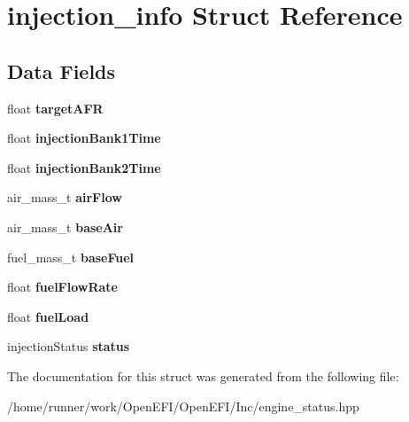\hypertarget{structinjection__info}{}\section{injection\+\_\+info Struct Reference}
\label{structinjection__info}
\subsection*{Data Fields}
\begin{DoxyCompactItemize}
\item 
\mbox{\label{structinjection__info_ae0092c39808dc3142c3d3d9ff9a287a1}} 
float {\bfseries target\+A\+FR}
\item 
\mbox{\label{structinjection__info_aa680a09463b9ce4a25fab9b55d8faf37}} 
float {\bfseries injection\+Bank1\+Time}
\item 
\mbox{\label{structinjection__info_ad1c2f5e303fa43a98c50a3b119919734}} 
float {\bfseries injection\+Bank2\+Time}
\item 
\mbox{\label{structinjection__info_aaabc3c6fa43d19796479d4b903c5fe0a}} 
air\+\_\+mass\+\_\+t {\bfseries air\+Flow}
\item 
\mbox{\label{structinjection__info_a87091e6f6a933f9f7f453be078176e71}} 
air\+\_\+mass\+\_\+t {\bfseries base\+Air}
\item 
\mbox{\label{structinjection__info_a0a944518225f2a4ec22f0a08cbaf7dff}} 
fuel\+\_\+mass\+\_\+t {\bfseries base\+Fuel}
\item 
\mbox{\label{structinjection__info_aeca7a555126e8d4b288537884db82242}} 
float {\bfseries fuel\+Flow\+Rate}
\item 
\mbox{\label{structinjection__info_a1a608b32a11d48524d284cdfb219700d}} 
float {\bfseries fuel\+Load}
\item 
\mbox{\label{structinjection__info_ae97ea7561699ed96f1162a36e88792c8}} 
injection\+Status {\bfseries status}
\end{DoxyCompactItemize}


The documentation for this struct was generated from the following file\+:\begin{DoxyCompactItemize}
\item 
/home/runner/work/\+Open\+E\+F\+I/\+Open\+E\+F\+I/\+Inc/engine\+\_\+status.\+hpp\end{DoxyCompactItemize}
